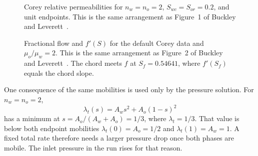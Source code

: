\documentclass[11pt]{article}
\begin{document}
\begin{figure}[ht]
\centering
{}
\caption{Corey relative permeabilities for $n_w = n_o = 2$, $S_{wc} = S_{or} = 0.2$, and unit endpoints.
This is the same arrangement as Figure~1 of Buckley and Leverett~\cite{buckley1942}.}
\label{fig:kr}
\end{figure}

\begin{figure}[ht]
\centering
{}
\caption{Fractional flow and $f'(S)$ for the default Corey data and $\mu_o/\mu_w = 2$.
This is the same arrangement as Figure~2 of Buckley and Leverett~\cite{buckley1942}.
The chord meets $f$ at $S_f = 0.54641$, where $f'(S_f)$ equals the chord slope.}
\label{fig:ff}
\end{figure}

One consequence of the same mobilities is used only by the pressure solution.
For $n_w = n_o = 2$,
\[
\lambda_t(s) = A_w s^2 + A_o(1-s)^2
\]
has a minimum at $s = A_o/(A_w+A_o) = 1/3$, where $\lambda_t = 1/3$.
That value is below both endpoint mobilities $\lambda_t(0) = A_o = 1/2$ and $\lambda_t(1) = A_w = 1$.
A fixed total rate therefore needs a larger pressure drop once both phases are mobile.
The inlet pressure in the run rises for that reason.
\end{document}
